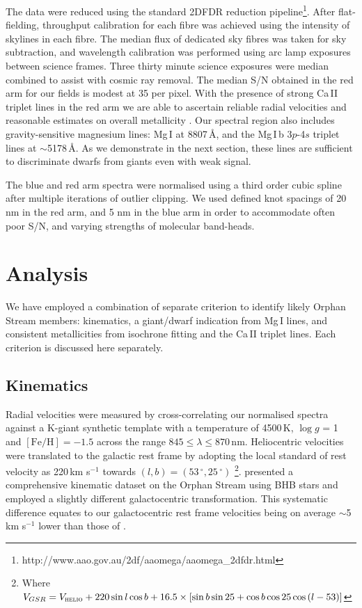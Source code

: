 \documentclass{emulateapj}
\begin{document}
The data were reduced using the standard \textsc{2DFDR} reduction pipeline\footnote{http://www.aao.gov.au/2df/aaomega/aaomega\_2dfdr.html}. After flat-fielding, throughput calibration for each fibre was achieved using the intensity of skylines in each fibre. The median flux of dedicated sky fibres was taken for sky subtraction, and wavelength calibration was performed using arc lamp exposures between science frames. Three thirty minute science exposures were median combined to assist with cosmic ray removal. The median S/N obtained in the red arm for our fields is modest at 35 per pixel. With the presence of strong Ca\,\textsc{II} triplet lines in the red arm we are able to ascertain reliable radial velocities and reasonable estimates on overall metallicity \citep[][and references therein]{Starkenburg;et-al_2010}. Our spectral region also includes gravity-sensitive magnesium lines: Mg\,\textsc{I} at 8807\,{\AA}, and the Mg\,\textsc{I}\,b 3$p$-4$s$ triplet lines at $\sim$5178\,{\AA}. As we demonstrate in the next section, these lines are sufficient to discriminate dwarfs from giants even with weak signal.

The blue and red arm spectra were normalised using a third order cubic spline after multiple iterations of outlier clipping. We used defined knot spacings of 20 nm in the red arm, and 5 nm in the blue arm in order to accommodate often poor S/N, and varying strengths of molecular band-heads.

\section{Analysis}
\label{sec:analysis}

We have employed a combination of separate criterion to identify likely Orphan Stream members: kinematics, a giant/dwarf indication from Mg\,\textsc{I} lines, and consistent metallicities from isochrone fitting and the Ca\,\textsc{II} triplet lines. Each criterion is discussed here separately.

\subsection{Kinematics}
Radial velocities were measured by cross-correlating our normalised spectra against a K-giant synthetic template with a temperature of 4500\,K, $\log{g}$ = 1 and $[\mbox{Fe/H}] = -1.5$ across the range $845 \leq \lambda \leq 870$\,nm. Heliocentric velocities were translated to the galactic rest frame by adopting the local standard of rest velocity as 220\,km s$^{-1}$ towards $(l, b) = (53\,^\circ, 25\,^\circ)$ \citep{Kerr;Lynden-Bell_1986, Mihalas;Binney_1981}\footnote{Where $V_{GSR} = V_{\textsc{helio}} + 220\sin{l}\cos{b} + 16.5\times[\sin{b}\sin{25} + \cos{b}\cos{25}\cos{(l - 53)}]$}. \citet{Newberg;et-al_2010} presented a comprehensive kinematic dataset on the Orphan Stream using BHB stars and employed a slightly different galactocentric transformation. This systematic difference equates to our galactocentric rest frame velocities being on average $\sim$5\,km s$^{-1}$ lower than those of \citet{Newberg;et-al_2010}.
\end{document}

